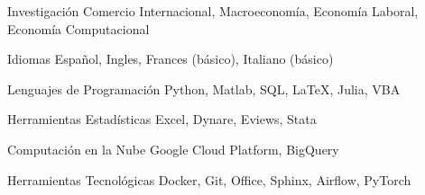 

\begin{cvskills}

\cvskill
    {Investigación} %
    {Comercio Internacional, Macroeconomía, Economía Laboral, Economía Computacional} %

\cvskill
    {Idiomas} %
    {Español, Ingles, Frances (básico), Italiano (básico)} %

\cvskill
    {Lenguajes de Programación} %
    {Python, Matlab, SQL, LaTeX, Julia, VBA} %

\cvskill
    {Herramientas Estadísticas} %
    {Excel, Dynare, Eviews, Stata} %

\cvskill
    {Computación en la Nube} %
    {Google Cloud Platform, BigQuery} %

\cvskill
    {Herramientas Tecnológicas} %
    {Docker, Git, Office, Sphinx, Airflow, PyTorch} %

\end{cvskills}

